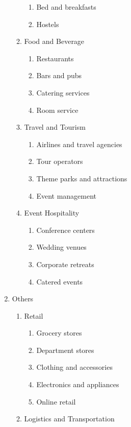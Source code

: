 \begin{enumerate}
\begin{enumerate}
\begin{enumerate}
            \item Bed and breakfasts
            \item Hostels
        \end{enumerate}
        \item Food and Beverage
        \begin{enumerate}
            \item Restaurants
            \item Bars and pubs
            \item Catering services
            \item Room service
        \end{enumerate}
        \item Travel and Tourism
        \begin{enumerate}
            \item Airlines and travel agencies
            \item Tour operators
            \item Theme parks and attractions
            \item Event management
        \end{enumerate}
        \item Event Hospitality
        \begin{enumerate}
            \item Conference centers
            \item Wedding venues
            \item Corporate retreats
            \item Catered events
        \end{enumerate}
    \end{enumerate}
    \item Others
    \begin{enumerate}
        \item Retail
        \begin{enumerate}
            \item Grocery stores
            \item Department stores
            \item Clothing and accessories
            \item Electronics and appliances
            \item Online retail
        \end{enumerate}
        \item Logistics and Transportation
        \begin{enumerate}

\end{enumerate}
\end{enumerate}
\end{enumerate}
